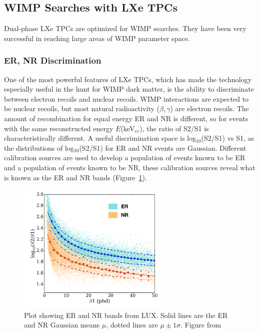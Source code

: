 \subsection{WIMP Searches with LXe TPCs}
Dual-phase \ac{LXe} \ac{TPC}s are optimized for WIMP searches. They have been very successful in reaching large areas of WIMP parameter space. 

\subsubsection{ER, NR Discrimination}
\label{sec:er_nr_discrimination}
One of the most powerful features of \ac{LXe} \ac{TPC}s, which has made the technology especially useful in the hunt for WIMP dark matter, is the ability to discriminate between electron recoils and nuclear recoils. \ac{WIMP} interactions are expected to be nuclear recoils, but most natural radioactivity ($\beta , \gamma$) are electron recoils. The amount of recombination for equal energy \ac{ER} and \ac{NR} is different, so for events with the same reconstructed energy $E$(keV$_{ee}$), the ratio of S2/S1 is characteristically different. A useful discrimination space is log$_{10}$(S2/S1) vs S1, as the distributions of log$_{10}$(S2/S1) for \ac{ER} and \ac{NR} events are Gaussian. Different calibration sources are used to develop a population of events known to be \ac{ER} and a population of events known to be \ac{NR}, these calibration sources reveal what is known as the \ac{ER} and \ac{NR} bands (Figure~\ref{fig:bands}).

\begin{figure}[htbp]
\begin{center}
\includegraphics[width=0.65\textwidth]{figures/lxetpcs/bands.png}
\caption{Plot showing ER and NR bands from LUX. Solid lines are the ER and NR Gaussian means $\mu$, dotted lines are $\mu \pm 1 \sigma$. Figure from \cite{LUX:YieldsAndRecombination} }
\label{fig:bands}
\end{center}
\end{figure}


